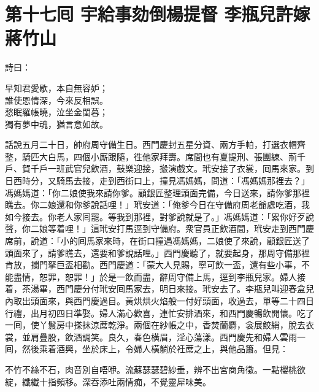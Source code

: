 
\chapter*{第十七囘 宇給事劾倒楊提督 李瓶兒許嫁蔣竹山}


詩曰：

\begin{myquote}
早知君愛歇，本自無容妒；\\誰使恩情深，今來反相誤。\\愁眠羅帳曉，泣坐金閨暮；\\獨有夢中魂，猶言意如故。
\end{myquote}

話說五月二十日，帥府周守備生日。西門慶封五星分資、兩方手帕，打選衣帽齊整，騎匹大白馬，四個小厮跟隨，徃他家拜壽。席間也有夏提刑、張團練、荊千戶、賀千戶一班武官兒飲酒，鼓樂迎接，搬演戲文。玳安接了衣裳，囘馬來家。到日西時分，又騎馬去接，走到西街口上，撞見馮媽媽，問道：「馮媽媽那裡去？」馮媽媽道：「你二娘使我來請你爹。顧銀匠整理頭面完備，今日送來，請你爹那裡瞧去。你二娘還和你爹說話哩！」玳安道：「俺爹今日在守備府周老爺處吃酒，我如今接去。你老人家囘罷。等我到那裡，對爹說就是了。」馮媽媽道：「累你好歹說聲，你二娘等着哩！」這玳安打馬逕到守備府。衆官員正飲酒間，玳安走到西門慶席前，說道：「小的囘馬家來時，在街口撞遇馮媽媽，二娘使了來說，顧銀匠送了頭面來了，請爹瞧去，還要和爹說話哩。」西門慶聽了，就要起身，那周守備那裡肯放，攔門拏巨盃相勸。西門慶道：「蒙大人見賜，寧可飲一盃，還有些小事，不能盡情，恕罪，恕罪！」於是一飲而盡，辭周守備上馬，逕到李瓶兒家。婦人接着，茶湯畢，西門慶分付玳安囘馬家去，明日來接。玳安去了。李瓶兒叫迎春盒兒內取出頭面來，與西門慶過目。黃烘烘火焰般一付好頭面，收過去，單等二十四日行禮，出月初四日準娶。婦人滿心歡喜，連忙安排酒來，和西門慶暢飲開懷。吃了一囘，使丫鬟房中搽抹涼蓆乾淨。兩個在紗帳之中，香焚蘭麝，衾展鮫綃，脫去衣裳，並肩疊股，飲酒調笑。良久，春色橫眉，淫心蕩漾。西門慶先和婦人雲雨一囘，然後乘着酒興，坐於床上，令婦人橫躺於衽蓆之上，與他品簫。但見：

\begin{myquote}
不竹不絲不石，肉音別自唔咿。流蘇瑟瑟碧紗垂，辨不出宮商角徵。一點櫻桃欲綻，纖纖十指頻移。深吞添吐兩情痴，不覺靈犀味美。
\end{myquote}

